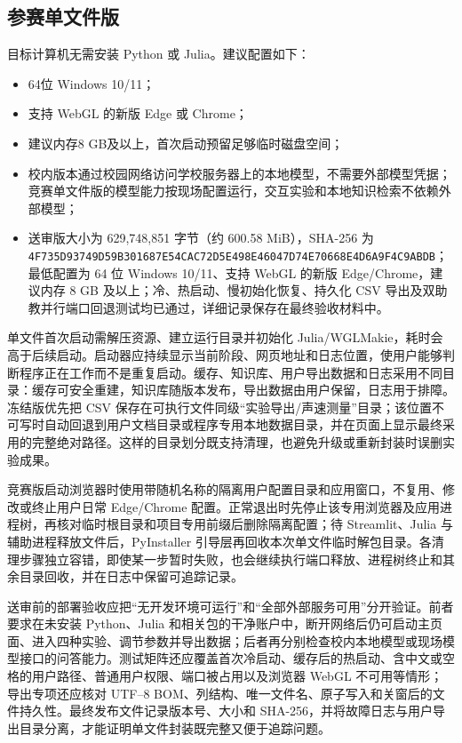 \documentclass[UTF8,a4paper,zihao=-4]{ctexart}
\begin{document}
\subsection{参赛单文件版}
目标计算机无需安装 Python 或 Julia。建议配置如下：
\begin{itemize}
  \item 64位 Windows 10/11；
  \item 支持 WebGL 的新版 Edge 或 Chrome；
  \item 建议内存8 GB及以上，首次启动预留足够临时磁盘空间；
  \item 校内版本通过校园网络访问学校服务器上的本地模型，不需要外部模型凭据；竞赛单文件版的模型能力按现场配置运行，交互实验和本地知识检索不依赖外部模型；
  \item 送审版大小为 629,748,851 字节（约 600.58 MiB），SHA-256 为 \texttt{4F735D93\allowbreak{}749D59B3\allowbreak{}01687E54\allowbreak{}CAC72D5E\allowbreak{}498E4604\allowbreak{}7D74E706\allowbreak{}68E4D6A9\allowbreak{}F4C9ABDB}；最低配置为 64 位 Windows 10/11、支持 WebGL 的新版 Edge/Chrome，建议内存 8 GB 及以上；冷、热启动、慢初始化恢复、持久化 CSV 导出及双助教并行端口回退测试均已通过，详细记录保存在最终验收材料中。
\end{itemize}

单文件首次启动需解压资源、建立运行目录并初始化 Julia/WGLMakie，耗时会高于后续启动。启动器应持续显示当前阶段、网页地址和日志位置，使用户能够判断程序正在工作而不是重复启动。缓存、知识库、用户导出数据和日志采用不同目录：缓存可安全重建，知识库随版本发布，导出数据由用户保留，日志用于排障。冻结版优先把 CSV 保存在可执行文件同级“实验导出/声速测量”目录；该位置不可写时自动回退到用户文档目录或程序专用本地数据目录，并在页面上显示最终采用的完整绝对路径。这样的目录划分既支持清理，也避免升级或重新封装时误删实验成果。

竞赛版启动浏览器时使用带随机名称的隔离用户配置目录和应用窗口，不复用、修改或终止用户日常 Edge/Chrome 配置。正常退出时先停止该专用浏览器及应用进程树，再核对临时根目录和项目专用前缀后删除隔离配置；待 Streamlit、Julia 与辅助进程释放文件后，PyInstaller 引导层再回收本次单文件临时解包目录。各清理步骤独立容错，即使某一步暂时失败，也会继续执行端口释放、进程树终止和其余目录回收，并在日志中保留可追踪记录。

送审前的部署验收应把“无开发环境可运行”和“全部外部服务可用”分开验证。前者要求在未安装 Python、Julia 和相关包的干净账户中，断开网络后仍可启动主页面、进入四种实验、调节参数并导出数据；后者再分别检查校内本地模型或现场模型接口的问答能力。测试矩阵还应覆盖首次冷启动、缓存后的热启动、含中文或空格的用户路径、普通用户权限、端口被占用以及浏览器 WebGL 不可用等情形；导出专项还应核对 UTF--8 BOM、列结构、唯一文件名、原子写入和关窗后的文件持久性。最终发布文件记录版本号、大小和 SHA-256，并将故障日志与用户导出目录分离，才能证明单文件封装既完整又便于追踪问题。
\end{document}
